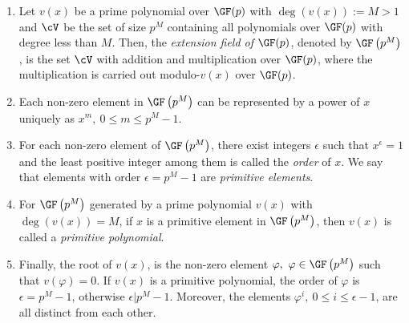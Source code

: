 \begin{enumerate}
\item Let $v(x)$ be a prime polynomial over $\GF(p)$ with $\deg(v(x)):=M>1$ and $\cV$ be the set of size $p^M$ containing all polynomials over $\GF(p)$ with degree less than $M$. Then, the \textit{extension field of $\GF(p)$}, denoted by $\GF\left(p^M\right)$, is the set $\cV$ with addition and multiplication over $\GF(p)$, where the multiplication is carried out modulo-$v(x)$ over $\GF(p)$.

\item Each non-zero element in $\GF \left(p^M\right)$ can be represented by a power of $x$ uniquely as $x^m,~0 \leq m \leq p^M-1$. 

\item For each non-zero element of $\GF \left(p^M\right)$, there exist integers $\epsilon$ such that $x^{\epsilon}=1$ and the least positive integer among them is called the \textit{order} of $x$. We say that elements with order $\epsilon=p^M-1$ are \textit{primitive elements}. 

\item For $\GF \left(p^M\right)$ generated by a prime polynomial $v(x)$ with $\deg(v(x))=M$, if $x$ is a primitive element in $\GF \left(p^M\right)$, then  $v(x)$ is called a \textit{primitive polynomial}. 
%

\item Finally, the root of $v(x)$, is the non-zero element $\varphi,~\varphi \in \GF \left(p^M\right)$ such that $v(\varphi)=0$. If $v(x)$ is a primitive polynomial, the order of $\varphi$ is $\epsilon=p^M-1$, otherwise $\epsilon | p^M-1$. 
Moreover, the elements $\varphi^i,~0 \leq i \leq \epsilon -1$, are all distinct from each other.
 \end{enumerate}

